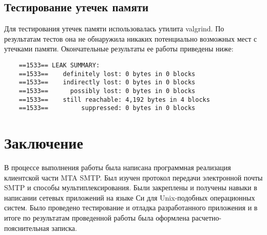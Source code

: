 \documentclass[a4paper,12pt]{report}
\begin{document}
\section{Тестирование утечек памяти}

Для тестирования утечек памяти использовалась утилита valgrind. По результатам тестов она не обнаружила никаких потенциально возможных мест с утечками памяти. Окончательные результаты ее работы приведены ниже:
\begin{verbatim}
    ==1533== LEAK SUMMARY:
    ==1533==    definitely lost: 0 bytes in 0 blocks
    ==1533==    indirectly lost: 0 bytes in 0 blocks
    ==1533==      possibly lost: 0 bytes in 0 blocks
    ==1533==    still reachable: 4,192 bytes in 4 blocks
    ==1533==         suppressed: 0 bytes in 0 blocks

\end{verbatim}


\clearpage
\chapter*{Заключение}

В процессе выполнения работы была написана программная реализация клиентской части MTA SMTP. Был изучен протокол передачи электронной почты SMTP и способы мультиплексирования. Были закреплены и получены навыки в написании сетевых приложений на языке Си для Unix-подобных операционных систем. Было проведено тестирование и отладка разработанного приложения и в итоге по результатам проведенной работы была оформлена расчетно-пояснительная записка.
\end{document}
